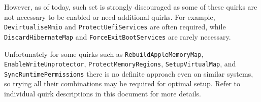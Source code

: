 \documentclass[]{article}
\begin{document}
\begin{enumerate}
  However, as of today, such set is strongly discouraged as some of these quirks
  are not necessary to be enabled or need additional quirks. For example,
  \texttt{DevirtualiseMmio} and \texttt{ProtectUefiServices} are often required,
  while \texttt{DiscardHibernateMap} and \texttt{ForceExitBootServices} are rarely
  necessary.

  Unfortunately for some quirks such as \texttt{RebuildAppleMemoryMap},
  \texttt{EnableWriteUnprotector}, \texttt{ProtectMemoryRegions},
  \texttt{SetupVirtualMap}, and \texttt{SyncRuntimePermissions} there
  is no definite approach even on similar systems, so trying all their
  combinations may be required for optimal setup. Refer to individual quirk
  descriptions in this document for more details.

\end{enumerate}
\end{document}
